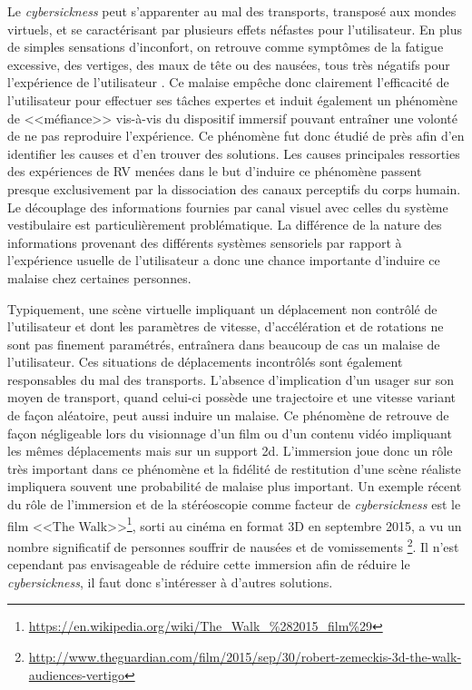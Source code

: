 Le \textit{cybersickness} peut s'apparenter au mal des transports, transposé aux mondes virtuels, et se caractérisant par plusieurs effets néfastes pour l'utilisateur. En plus de simples sensations d'inconfort, on retrouve comme symptômes de la fatigue excessive, des vertiges, des maux de tête ou des nausées, tous très négatifs pour l'expérience de l'utilisateur \cite{kolasinski1995simulator,laviola_jr_discussion_2000}. Ce malaise empêche donc clairement l'efficacité de l'utilisateur pour effectuer ses tâches expertes et induit également un phénomène de <<méfiance>> vis-à-vis du dispositif immersif pouvant entraîner une volonté de ne pas reproduire l'expérience. Ce phénomène fut donc étudié de près afin d'en identifier les causes et d'en trouver des solutions. Les causes principales ressorties des expériences de RV menées dans le but d'induire ce phénomène passent presque exclusivement par la dissociation des canaux perceptifs du corps humain. Le découplage des informations fournies par canal visuel avec celles du système vestibulaire est particulièrement problématique. La différence de la nature des informations provenant des différents systèmes sensoriels par rapport à l'expérience usuelle de l'utilisateur a donc une chance importante d'induire ce malaise chez certaines personnes\cite{reason1975motion}.

Typiquement, une scène virtuelle impliquant un déplacement non contrôlé de l'utilisateur et dont les paramètres de vitesse, d'accélération et de rotations ne sont pas finement paramétrés, entraînera dans beaucoup de cas un malaise de l'utilisateur. Ces situations de déplacements incontrôlés sont également responsables du mal des transports. L'absence d'implication d'un usager sur son moyen de transport, quand celui-ci possède une trajectoire et une vitesse variant de façon aléatoire, peut aussi induire un malaise. Ce phénomène de retrouve de façon négligeable lors du visionnage d'un film ou d'un contenu vidéo impliquant les mêmes déplacements mais sur un support 2d. L'immersion joue donc un rôle très important dans ce phénomène et la fidélité de restitution d'une scène réaliste impliquera souvent une probabilité de malaise plus important. Un exemple récent du rôle de l'immersion et de la stéréoscopie comme facteur de \textit{cybersickness} est le film <<The Walk>>\footnote{\url{https://en.wikipedia.org/wiki/The\_Walk\_\%282015\_film\%29}}, sorti au cinéma en format 3D en septembre 2015, a vu un nombre significatif de personnes souffrir de nausées et de vomissements \footnote{\url{http://www.theguardian.com/film/2015/sep/30/robert-zemeckis-3d-the-walk-audiences-vertigo}}. Il n'est cependant pas envisageable de réduire cette immersion afin de réduire le \textit{cybersickness}, il faut donc s'intéresser à d'autres solutions.

